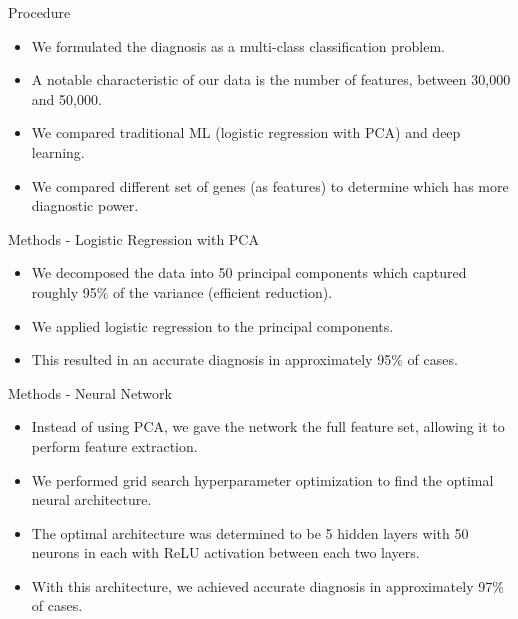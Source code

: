 \documentclass{beamer}
\begin{document}
    \begin{frame}{Procedure}
        \begin{itemize} \setlength\itemsep{15pt}
            \item {
                We formulated the diagnosis as a multi-class classification problem.
            }
            \item {
                A notable characteristic of our data is the number of features, between
                30,000 and 50,000.
            }
            \item {
                We compared traditional ML (logistic regression with PCA) 
                and deep learning.
            }
            \item {
                We compared different set of genes (as features) to determine which
                has more diagnostic power.
            }
        \end{itemize}
    \end{frame}

    \begin{frame}{Methods - Logistic Regression with PCA}
        \begin{itemize} \setlength\itemsep{15pt}
            \item {
                We decomposed the data into 50 principal components which captured
                roughly 95\% of the variance (efficient reduction).
            }
            \item {
                We applied logistic regression to the principal components.
            }
            \item {
                This resulted in an accurate diagnosis in approximately 95\% of cases.
            }
        \end{itemize}
    \end{frame}

    \begin{frame}{Methods - Neural Network}
        \begin{itemize} \setlength\itemsep{15pt}
            \item {
                Instead of using PCA, we gave the network the full feature set, allowing it to
                perform feature extraction.
            }
            \item {
                We performed grid search hyperparameter optimization to find the optimal neural
                architecture.
            }
            \item {
                The optimal architecture was determined to be 5 hidden layers with 50 neurons in
                each with ReLU activation between each two layers.
            }
            \item {
                With this architecture, we achieved accurate diagnosis in approximately 97\% of cases.
            }
        \end{itemize}
    \end{frame}
\end{document}
